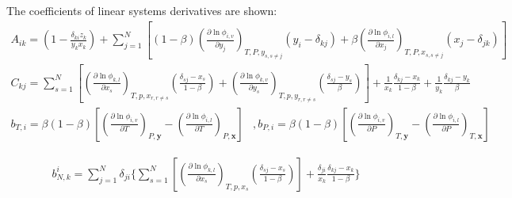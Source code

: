 The coefficients of linear systems derivatives are shown:
\begin{align}
\mathit{A}_{ik} = \left( 1- \frac{\delta_{ki}z_k}{y_k x_k}\right) +\sum_{j=1}^N\left[(1-\beta)\left(\frac{\partial \ln\phi_{i,v}}{\partial y_j}\right)_{T,P,y_{s,s\neq j}}\left(y_i-\delta_{kj}\right)+\beta\left(\frac{\partial \ln\phi_{i,l}}{\partial x_j}\right)_{T,P,x_{s,s\neq j}}\left(x_j-\delta_{jk}\right)\right]
\end{align}
\begin{align}
C_{kj}=\sum_{s=1}^N\left[\left(\frac{\partial \ln\phi_{k,l}}{\partial x_s}\right)_{T,p,x_{r,r\neq s}}\left(\frac{\delta_{sj}-x_s}{1-\beta}\right)+\left(\frac{\partial \ln\phi_{k,v}}{\partial y_s}\right)_{T,p,y_{r,r\neq s}}\left(\frac{\delta_{sj}-y_s}{\beta}\right)\right] +\frac{1}{x_k}\frac{\delta_{kj}-x_k}{1-\beta}+\frac{1}{y_k}\frac{\delta_{kj}-y_k}{\beta}
\end{align}
\begin{align}
b_{T,i}=\beta(1-\beta)\left[\left(\frac{\partial \ln\phi_{i,v}}{\partial T}\right)_{P,\mathbf{y}}-\left(\frac{\partial \ln\phi_{i,l}}{\partial T}\right)_{P,\mathbf{x}}\right]&, b_{P,i}=\beta(1-\beta)\left[\left(\frac{\partial \ln\phi_{i,v}}{\partial P}\right)_{T,\mathbf{y}}-\left(\frac{\partial \ln\phi_{i,l}}{\partial P}\right)_{T,\mathbf{x}}\right]
\end{align}


\begin{align}
b_{N,k}^i=\sum_{j=1}^N\delta_{ji}\Bigg\{\sum_{s=1}^N\left[\left(\frac{\partial \ln\phi_{k,l}}{\partial x_s}\right)_{T,p,x_s}\left(\frac{\delta_{sj}-x_s}{1-\beta}\right)\right]+\frac{\delta_{ji}}{x_k}\frac{\delta_{kj}-x_k}{1-\beta}\Bigg\}
\end{align}

